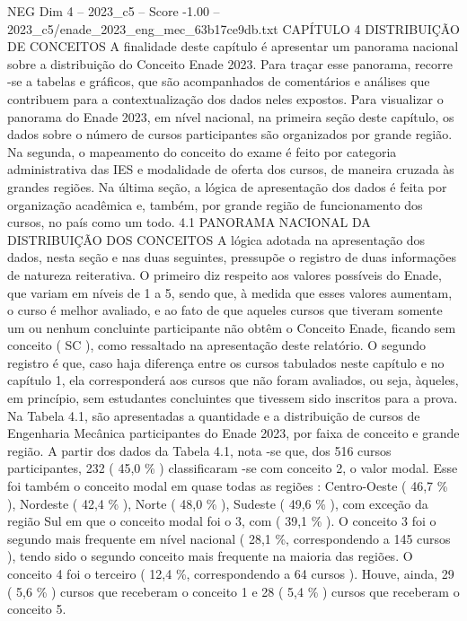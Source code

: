 \begin{textsample}{NEG Dim 4 – 2023\_c5 – Score -1.00 – 2023\_c5/enade\_2023\_eng\_mec\_63b17ce9db.txt}  \label{ex:f4_neg_096}
CAPÍTULO 4 DISTRIBUIÇÃO DE CONCEITOS A finalidade deste capítulo é apresentar um panorama nacional sobre a distribuição do Conceito Enade 2023.
Para traçar esse panorama, recorre -se a tabelas e gráficos, que são acompanhados de comentários e análises que contribuem para a contextualização dos dados neles expostos.
Para visualizar o panorama do Enade 2023, em nível nacional, na primeira seção deste capítulo, os dados sobre o número de cursos participantes são organizados por grande região.
Na segunda, o mapeamento do conceito do exame é feito por categoria administrativa das IES e modalidade de oferta dos cursos, de maneira cruzada às grandes regiões.
Na última seção, a lógica de apresentação dos dados é feita por organização acadêmica e, também, por grande região de funcionamento dos cursos, no país como um todo. 4.1 PANORAMA NACIONAL DA DISTRIBUIÇÃO DOS CONCEITOS A lógica adotada na apresentação dos dados, nesta seção e nas duas seguintes, pressupõe o registro de duas informações de natureza reiterativa.
O primeiro diz respeito aos valores possíveis do Enade, que variam em níveis de 1 a 5, sendo que, à medida que esses valores aumentam, o curso é melhor avaliado, e ao fato de que aqueles cursos que tiveram somente um ou nenhum concluinte participante não obtêm o Conceito Enade, ficando sem conceito ( SC ), como ressaltado na apresentação deste relatório.
O segundo registro é que, caso haja diferença entre os cursos tabulados neste capítulo e no capítulo 1, ela corresponderá aos cursos que não foram avaliados, ou seja, àqueles, em princípio, sem estudantes concluintes que tivessem sido inscritos para a prova.
Na Tabela 4.1, são apresentadas a quantidade e a distribuição de cursos de Engenharia Mecânica participantes do Enade 2023, por faixa de conceito e grande região.
A partir dos dados da Tabela 4.1, nota -se que, dos 516 cursos participantes, 232 ( 45,0 \% ) classificaram -se com conceito 2, o valor modal.
Esse foi também o conceito modal em quase todas as regiões : Centro-Oeste ( 46,7 \% ), Nordeste ( 42,4 \% ), Norte ( 48,0 \% ), Sudeste ( 49,6 \% ), com exceção da região Sul em que o conceito modal foi o 3, com ( 39,1 \% ).
O conceito 3 foi o segundo mais frequente em nível nacional ( 28,1 \%, correspondendo a 145 cursos ), tendo sido o segundo conceito mais frequente na maioria das regiões.
O conceito 4 foi o terceiro ( 12,4 \%, correspondendo a 64 cursos ).
Houve, ainda, 29 ( 5,6 \% ) cursos que receberam o conceito 1 e 28 ( 5,4 \% ) cursos que receberam o conceito 5.

\end{textsample}
